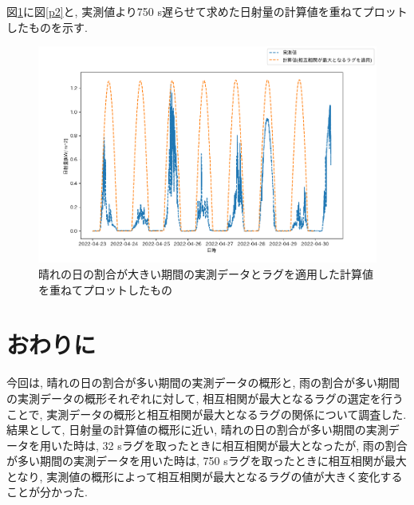 \documentclass[a4j,12pt,]{jarticle}
\begin{document}
図\ref{p4}に図\ref{p2}と, 実測値より750 \si{\second}遅らせて求めた日射量の計算値を重ねてプロットしたものを示す.

\begin{figure}[H]
  \begin{center}
    \includegraphics[width=160mm]{4.png}
    \caption{晴れの日の割合が大きい期間の実測データとラグを適用した計算値を重ねてプロットしたもの}
    \label{p4}
  \end{center}
\end{figure}

\section{おわりに}
今回は, 晴れの日の割合が多い期間の実測データの概形と, 雨の割合が多い期間の実測データの概形それぞれに対して, 相互相関が最大となるラグの選定を行うことで, 実測データの概形と相互相関が最大となるラグの関係について調査した.
結果として, 日射量の計算値の概形に近い, 晴れの日の割合が多い期間の実測データを用いた時は, 32 \si{\second}ラグを取ったときに相互相関が最大となったが, 雨の割合が多い期間の実測データを用いた時は, 750 \si{\second}ラグを取ったときに相互相関が最大となり, 実測値の概形によって相互相関が最大となるラグの値が大きく変化することが分かった.
\end{document}
